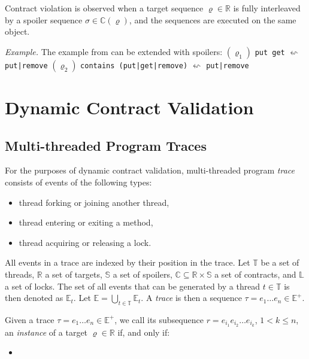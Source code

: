 Contract violation is observed when a target sequence $\varrho \in \mathbb{R}$
is fully interleaved by a spoiler sequence $\sigma \in \mathbb{C}(\varrho)$, and
the sequences are executed on the same object.

\emph{Example.} The example from  can be extended with spoilers:
 \newline
    $(\varrho_1)$ \texttt{put get} $\leftsquigarrow$ \texttt{put|remove} \newline
    $(\varrho_2)$ \texttt{contains (put|get|remove)} $\leftsquigarrow$
    \texttt{put|remove} \newline



\section{Dynamic Contract Validation}


\subsection{Multi-threaded Program Traces}

For the purposes of dynamic contract validation, multi-threaded program
\emph{trace} consists of events of the following types:
\begin{itemize}
    \item thread forking or joining another thread,
    \item thread entering or exiting a method,
    \item thread acquiring or releasing a lock.
\end{itemize}

All events in a trace are indexed by their position in the trace. Let
$\mathbb{T}$ be a set of threads, $\mathbb{R}$ a set of targets, $\mathbb{S}$ a
set of spoilers, $\mathbb{C} \subseteq \mathbb{R} \times \mathbb{S}$ a set of
contracts, and $\mathbb{L}$ a set of locks. The set of all events that can be
generated by a thread $t \in \mathbb{T}$ is then denoted as $\mathbb{E}_t$. Let
$\mathbb{E} = \bigcup_{t \in \mathbb{T}} \mathbb{E}_t$. A \emph{trace} is then a
sequence $\tau = e_1 \hdots e_n \in \mathbb{E}^+$.


Given a trace $\tau = e_1 \hdots e_n \in \mathbb{E}^+$, we call its subsequence
$r = e_{i_1} e_{i_2} \hdots e_{i_k}$, $1 < k \leq n$, an \emph{instance} of a
target $\varrho \in \mathbb{R}$ if, and only if:
\begin{itemize}
    \item \todo{}
\end{itemize}

